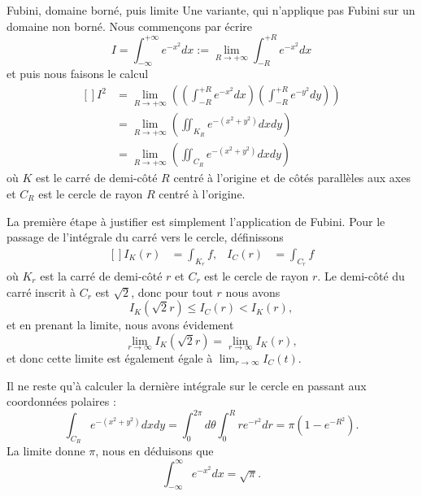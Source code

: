 \begin{example}
\begin{subproof}
		\item[Fubini, domaine borné, puis limite]
		Une variante, qui n'applique pas Fubini sur un domaine non borné. Nous commençons par écrire
		\begin{equation}
			I=\int_{-\infty}^{+\infty} e^{-x^2} dx := \lim_{R \to +\infty} \int_{-R}^{+R} e^{-x^2} dx
		\end{equation}
		et puis nous faisons le calcul
		\begin{equation}		\label{EqCalculInteeemoisxcar}
			\begin{aligned}[]
				I^2 & = \lim_{R \to +\infty} \left( (\int_{-R}^{+R} e^{-x^2} dx)( \int_{-R}^{+R} e^{-y^2} dy) \right) \\
				    & = \lim_{R \to +\infty} \left( \iint_{K_R}e^{-(x^2+y^2)} dx dy \right)                           \\
				    & = \lim_{R \to +\infty} \left( \iint_{C_R}e^{-(x^2+y^2)} dx dy \right)
			\end{aligned}
		\end{equation}
		où $K$ est le carré de demi-côté $R$ centré à l'origine et de côtés parallèles aux axes et $C_R$ est le cercle de rayon $R$ centré à l'origine.

		La première étape à justifier est simplement l'application de Fubini. Pour le passage de l'intégrale du carré vers le cercle, définissons
		\begin{equation}
			\begin{aligned}[]
				I_K(r) & =\int_{K_r}f, & I_C(r) & =\int_{C_r}f
			\end{aligned}
		\end{equation}
		où $K_r$ est la carré de demi-côté $r$ et $C_r$ est le cercle de rayon $r$. Le demi-côté du carré inscrit à $C_r$ est $\sqrt{2}$, donc pour tout $r$ nous avons
		\begin{equation}
			I_K(\sqrt{2}r)\leq I_C(r)<I_K(r),
		\end{equation}
		et en prenant la limite, nous avons évidement
		\begin{equation}
			\lim_{r\to \infty}I_K(\sqrt{2}r)=\lim_{r\to\infty}I_K(r),
		\end{equation}
		et donc cette limite est également égale à $\lim_{r\to\infty}I_C(t)$.

		Il ne reste qu'à calculer la dernière intégrale sur le cercle en passant aux coordonnées polaires :
		\begin{equation}
			\int_{C_R} e^{-(x^2+y^2)}dxdy=\int_0^{2\pi}d\theta\int_0^Rr e^{-r^2}dr=\pi(1- e^{-R^2}).
		\end{equation}
		La limite donne $\pi$, nous en déduisons que
		\begin{equation}    \label{EqFDvHTg}
			\int_{-\infty}^{\infty} e^{-x^2}dx=\sqrt{\pi}.
		\end{equation}
	\end{subproof}

\end{example}

